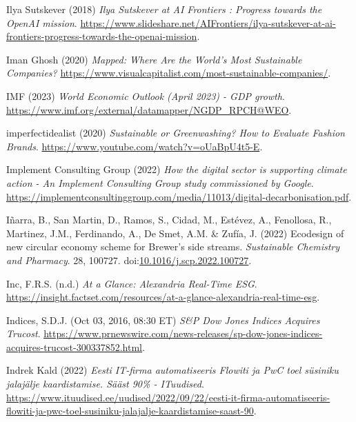 \documentclass[
  letterpaper,
  DIV=11,
  numbers=noendperiod]{scrartcl}
\newlength{\cslhangindent}
\newenvironment{CSLReferences}[2] %
 {\begin{list}{}{%
  \setlength{\itemindent}{0pt}
  \setlength{\leftmargin}{0pt}
  \setlength{\parsep}{0pt}
  \ifodd #1
   \setlength{\leftmargin}{\cslhangindent}
   \setlength{\itemindent}{-1\cslhangindent}
  \fi
  \setlength{\itemsep}{#2\baselineskip}}}
 {\end{list}}
\begin{document}
\begin{CSLReferences}{0}{1}
Ilya Sutskever (2018) \emph{Ilya {Sutskever} at {AI Frontiers} :
{Progress} towards the {OpenAI} mission}.
\url{https://www.slideshare.net/AIFrontiers/ilya-sutskever-at-ai-frontiers-progress-towards-the-openai-mission}.

Iman Ghosh (2020) \emph{Mapped: {Where Are} the {World}'s {Most
Sustainable Companies}?}
\url{https://www.visualcapitalist.com/most-sustainable-companies/}.

IMF (2023) \emph{World {Economic Outlook} ({April} 2023) - {GDP}
growth}. \url{https://www.imf.org/external/datamapper/NGDP_RPCH@WEO}.

imperfectidealist (2020) \emph{Sustainable or {Greenwashing}? {How} to
{Evaluate Fashion Brands}}.
\url{https://www.youtube.com/watch?v=oUaBpU4t5-E}.

Implement Consulting Group (2022) \emph{How the digital sector is
supporting climate action - {An Implement Consulting Group} study
commissioned by {Google}}.
\url{https://implementconsultinggroup.com/media/11013/digital-decarbonisation.pdf}.

Iñarra, B., San Martin, D., Ramos, S., Cidad, M., Estévez, A.,
Fenollosa, R., Martinez, J.M., Ferdinando, A., De Smet, A.M. \& Zufía,
J. (2022) Ecodesign of new circular economy scheme for {Brewer}'s side
streams. \emph{Sustainable Chemistry and Pharmacy}. 28, 100727.
doi:\href{https://doi.org/10.1016/j.scp.2022.100727}{10.1016/j.scp.2022.100727}.

Inc, F.R.S. (n.d.) \emph{At a {Glance}: {Alexandria Real-Time ESG}}.
\url{https://insight.factset.com/resources/at-a-glance-alexandria-real-time-esg}.

Indices, S.D.J. (Oct 03, 2016, 08:30 ET) \emph{S\&{P Dow Jones Indices
Acquires Trucost}}.
\url{https://www.prnewswire.com/news-releases/sp-dow-jones-indices-acquires-trucost-300337852.html}.

Indrek Kald (2022) \emph{Eesti {IT-firma} automatiseeris {Flowiti} ja
{PwC} toel s{ü}siniku jalaj{ä}lje kaardistamise. {S{ä}{ä}st} 90\% -
{ITuudised}}.
\url{https://www.ituudised.ee/uudised/2022/09/22/eesti-it-firma-automatiseeris-flowiti-ja-pwc-toel-susiniku-jalajalje-kaardistamise-saast-90}.


\end{CSLReferences}
\end{document}

